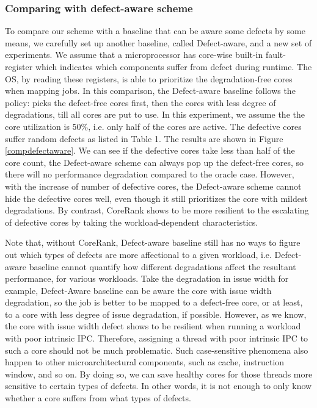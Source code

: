 \subsubsection{Comparing with defect-aware scheme}
To compare our scheme with a baseline that can be aware some defects by some means, we carefully set up another baseline, called Defect-aware, and a new set of experiments. We assume that a microprocessor has core-wise built-in fault-register which indicates which components suffer from defect during runtime. The OS, by reading these registers, is able to prioritize the degradation-free cores when mapping jobs.  In this comparison, the Defect-aware baseline follows the policy:  picks the defect-free cores first, then the cores with less degree of degradations, till all cores are put to use.  In this experiment, we assume the the core utilization is 50\%, i.e. only half of the cores are active.  The defective cores suffer random defects as listed in Table 1.  The results are shown in Figure \ref{compdefectaware}.  We can see if the defective cores take less than half of the core count, the Defect-aware scheme can always pop up the defect-free cores, so there will no performance degradation compared to the oracle case. However, with the increase of number of defective cores, the Defect-aware scheme cannot hide the defective cores well, even though it still prioritizes the core with mildest degradations.  By contrast, CoreRank shows to be more resilient to the escalating of defective cores by taking the workload-dependent characteristics.  

Note that, without CoreRank, Defect-aware baseline still has no ways to figure out which types of defects are more affectional to a given workload, i.e. Defect-aware baseline cannot quantify how different degradations affect the resultant performance, for various workloads. Take the degradation in issue width for example, Defect-Aware baseline can be aware the core with issue width degradation, so the job is better to be mapped to a defect-free core, or at least, to a core with less degree of issue degradation, if possible. However, as we know, the core with issue width defect shows to be resilient when running a workload with poor intrinsic IPC.  Therefore, assigning a thread with poor intrinsic IPC to such a core should not be much problematic. Such case-sensitive phenomena also happen to other microarchitectural components, such as cache, instruction window, and so on.  By doing so, we can save healthy cores for those threads more sensitive to certain types of defects.  In other words, it is not enough to only know whether a core suffers from what types of defects. 

